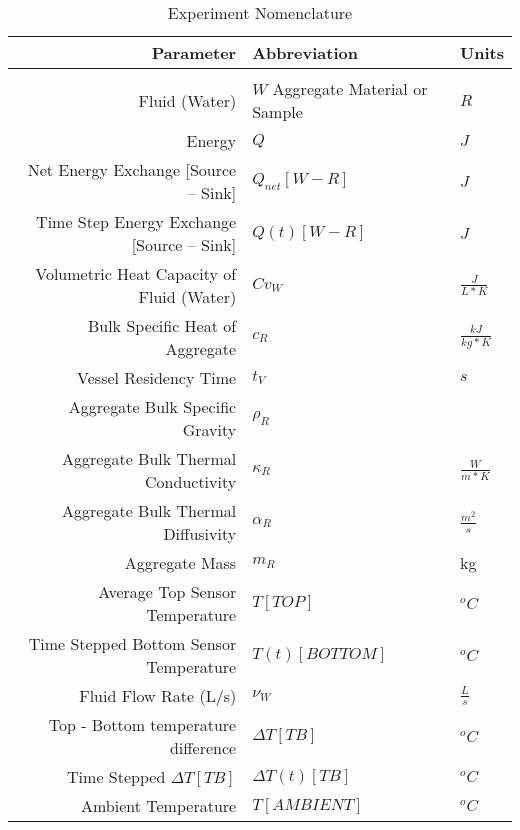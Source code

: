 \documentclass[a4paper,10pt]{scrbook}
\begin{document}
\begin{table}[t]
\caption{Experiment Nomenclature}
\label{simNom}
\centering
\begin{tabular}{r l l}
Parameter & Abbreviation & Units\\
\hline
\\[-.5ex]
Fluid (Water)					&	$W$
Aggregate Material or Sample			& 	$R$

\\
Energy						&	$Q$			& $J$\\

Net Energy Exchange [Source -- Sink]		&	$Q_{net}[W-R]$		& $J$\\

Time Step Energy Exchange [Source -- Sink]	&	$Q(t)[W-R]$		& $J$\\

Volumetric Heat Capacity of Fluid (Water)	&	$Cv_{W}$		& $\frac{J}{L*K}$\\

Bulk Specific Heat of Aggregate			&	$c_{R}$			& $\frac{kJ}{kg*K}$\\

Vessel Residency Time 				&	$t_{V}$			& $s$\\

Aggregate Bulk Specific Gravity			&	$\rho_{R}$		&\\

Aggregate Bulk Thermal Conductivity		&	$\kappa_{R}$		& $\frac{W}{m*K}$\\

Aggregate Bulk Thermal Diffusivity		&	$\alpha_{R}$		& $\frac{m^{2}}{s}$\\

Aggregate Mass					&	$m_{R}$			& kg

\\
Average Top Sensor Temperature 			&	$T[TOP]$		& $^{o}C$\\

Time Stepped Bottom Sensor Temperature 		&	$T(t)[BOTTOM]$		& $^{o}C$\\	

Fluid Flow Rate (L/s)				&	$\nu_{W}$		& $\frac{L}{s}$\\

Top - Bottom temperature difference 		&	$\Delta T[TB]$		& $^{o}C$\\

Time Stepped $\Delta T[TB]$ 			&	$\Delta T(t)[TB]$	& $^{o}C$\\

Ambient Temperature				&	$T[AMBIENT]$		& $^{o}C$\\

\hline
\end{tabular}
\end{table} 
\end{document}
